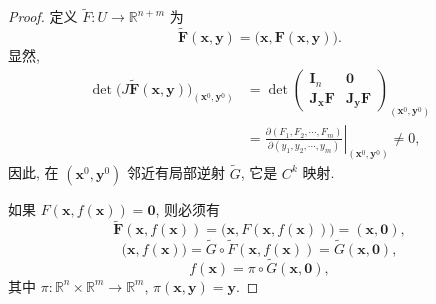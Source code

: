 \begin{proof}
定义 $\widetilde{F}: U \to \mathbb{R}^{n+m}$ 为
\[
  \widetilde{\boldsymbol{F}}(\boldsymbol{x}, \boldsymbol{y}) = \bigl(\boldsymbol{x}, \boldsymbol{F}(\boldsymbol{x}, \boldsymbol{y})\bigr).
\]
显然,
\begin{align*}
  \det\bigl(J\widetilde{\boldsymbol{F}}(\boldsymbol{x}, \boldsymbol{y})\bigr)_{(\boldsymbol{x}^{0}, \boldsymbol{y}^{0})} &= \det\begin{pmatrix}
    \boldsymbol{I}_{n} & \boldsymbol{0} \\
    \boldsymbol{J}_{\boldsymbol{x}}\boldsymbol{F} & \boldsymbol{J}_{\boldsymbol{y}}\boldsymbol{F}
  \end{pmatrix}_{(\boldsymbol{x}^{0}, \boldsymbol{y}^{0})} \\
  &= \left.\frac{\partial(F_{1}, F_{2}, \cdots, F_{m})}{\partial(y_{1}, y_{2}, \cdots, y_{m})}\right|_{(\boldsymbol{x}^{0}, \boldsymbol{y}^{0})} \neq 0,
\end{align*}
因此, 在 $(\boldsymbol{x}^{0}, \boldsymbol{y}^{0})$ 邻近有局部逆射 $\widetilde{G}$, 它是 $C^{k}$ 映射.

如果 $F(\boldsymbol{x}, f(\boldsymbol{x})) = \boldsymbol{0}$, 则必须有
\[
  \widetilde{\boldsymbol{F}}(\boldsymbol{x}, f(\boldsymbol{x})) = \bigl(\boldsymbol{x}, F(\boldsymbol{x}, f(\boldsymbol{x}))\bigr) = (\boldsymbol{x}, \boldsymbol{0}),
\]
\[
  \bigl(\boldsymbol{x}, f(\boldsymbol{x})\bigr) = \widetilde{G} \circ \widetilde{F}(\boldsymbol{x}, f(\boldsymbol{x})) = \widetilde{G}(\boldsymbol{x}, \boldsymbol{0}),
\]
\[
  f(\boldsymbol{x}) = \pi \circ \widetilde{G}(\boldsymbol{x}, \boldsymbol{0}),
\]
其中 $\pi: \mathbb{R}^{n} \times \mathbb{R}^{m} \to \mathbb{R}^{m}$, $\pi(\boldsymbol{x}, \boldsymbol{y}) = \boldsymbol{y}$.


\end{proof}
